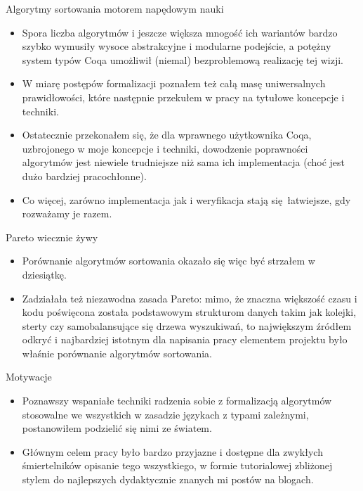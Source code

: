 \documentclass{beamer}
\begin{document}
\begin{frame}{Algorytmy sortowania motorem napędowym nauki}
\begin{itemize}
	\item Spora liczba algorytmów i jeszcze większa mnogość ich wariantów bardzo szybko wymusiły wysoce abstrakcyjne i modularne podejście, a potężny system typów Coqa umożliwił (niemal) bezproblemową realizację tej wizji.
	\item W miarę postępów formalizacji poznałem też całą masę uniwersalnych prawidłowości, które następnie przekułem w pracy na tytułowe koncepcje i techniki.
	\item Ostatecznie przekonałem się, że dla wprawnego użytkownika Coqa, uzbrojonego w moje koncepcje i techniki, dowodzenie poprawności algorytmów jest niewiele trudniejsze niż sama ich implementacja (choć jest dużo bardziej pracochłonne).
	\item Co więcej, zarówno implementacja jak i weryfikacja stają się łatwiejsze, gdy rozważamy je razem.
\end{itemize}
\end{frame}

\begin{frame}{Pareto wiecznie żywy}
\begin{itemize}
	\item Porównanie algorytmów sortowania okazało się więc być strzałem w dziesiątkę.
	\item Zadziałała też niezawodna zasada Pareto: mimo, że znaczna większość czasu i kodu poświęcona została podstawowym strukturom danych takim jak kolejki, sterty czy samobalansujące się drzewa wyszukiwań, to największym źródłem odkryć i najbardziej istotnym dla napisania pracy elementem projektu było właśnie porównanie algorytmów sortowania.
\end{itemize}
\end{frame}

\begin{frame}{Motywacje}
\begin{itemize}
	\item Poznawszy wspaniałe techniki radzenia sobie z formalizacją algorytmów stosowalne we wszystkich w zasadzie językach z typami zależnymi, postanowiłem podzielić się nimi ze światem.
	\item Głównym celem pracy było bardzo przyjazne i dostępne dla zwykłych śmiertelników opisanie tego wszystkiego, w formie tutorialowej zbliżonej stylem do najlepszych dydaktycznie znanych mi postów na blogach.
\end{itemize}
\end{frame}
\end{document}
